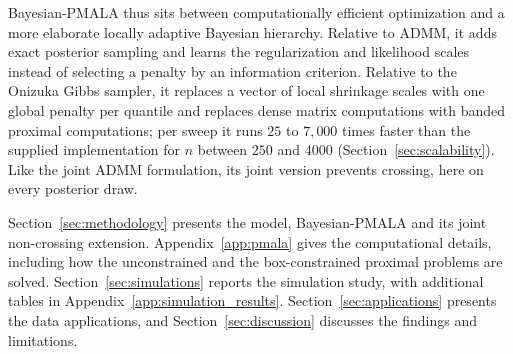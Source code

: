 Bayesian-PMALA thus sits between computationally efficient optimization and a more elaborate locally adaptive Bayesian hierarchy. Relative to ADMM, it adds exact posterior sampling and learns the regularization and likelihood scales instead of selecting a penalty by an information criterion. Relative to the Onizuka Gibbs sampler, it replaces a vector of local shrinkage scales with one global penalty per quantile and replaces dense matrix computations with banded proximal computations; per sweep it runs $25$ to $7{,}000$ times faster than the supplied implementation for $n$ between $250$ and $4000$ (Section~\ref{sec:scalability}). Like the joint ADMM formulation, its joint version prevents crossing, here on every posterior draw.

Section~\ref{sec:methodology} presents the model, Bayesian-PMALA and its joint non-crossing extension. Appendix~\ref{app:pmala} gives the computational details, including how the unconstrained and the box-constrained proximal problems are solved. Section~\ref{sec:simulations} reports the simulation study, with additional tables in Appendix~\ref{app:simulation_results}. Section~\ref{sec:applications} presents the data applications, and Section~\ref{sec:discussion} discusses the findings and limitations.
